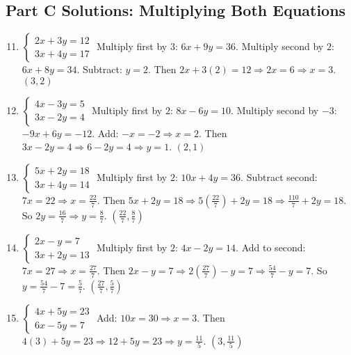\documentclass[12pt]{article}
\begin{document}
\subsection*{Part C Solutions: Multiplying Both Equations}
\begin{enumerate}
  \setcounter{enumi}{10}
  \item \(\begin{cases} 2x + 3y = 12 \\ 3x + 4y = 17 \end{cases}\)  
  Multiply first by \(3\): \(6x + 9y = 36\). Multiply second by \(2\): \(6x + 8y = 34\). Subtract: \(y = 2\).  
  Then \(2x + 3(2) = 12 \Rightarrow 2x = 6 \Rightarrow x = 3\).  
  \(\boxed{(3, 2)}\)

  \item \(\begin{cases} 4x - 3y = 5 \\ 3x - 2y = 4 \end{cases}\)  
  Multiply first by \(2\): \(8x - 6y = 10\). Multiply second by \(-3\): \(-9x + 6y = -12\). Add: \(-x = -2 \Rightarrow x = 2\).  
  Then \(3x - 2y = 4 \Rightarrow 6 - 2y = 4 \Rightarrow y = 1\).  
  \(\boxed{(2, 1)}\)

  \item \(\begin{cases} 5x + 2y = 18 \\ 3x + 4y = 14 \end{cases}\)  
  Multiply first by \(2\): \(10x + 4y = 36\). Subtract second: \(7x = 22 \Rightarrow x = \tfrac{22}{7}\).  
  Then \(5x + 2y = 18 \Rightarrow 5(\tfrac{22}{7}) + 2y = 18 \Rightarrow \tfrac{110}{7} + 2y = 18\).  
  So \(2y = \tfrac{16}{7} \Rightarrow y = \tfrac{8}{7}\).  
  \(\boxed{(\tfrac{22}{7}, \tfrac{8}{7})}\)

  \item \(\begin{cases} 2x - y = 7 \\ 3x + 2y = 13 \end{cases}\)  
  Multiply first by \(2\): \(4x - 2y = 14\). Add to second: \(7x = 27 \Rightarrow x = \tfrac{27}{7}\).  
  Then \(2x - y = 7 \Rightarrow 2(\tfrac{27}{7}) - y = 7 \Rightarrow \tfrac{54}{7} - y = 7\).  
  So \(y = \tfrac{54}{7} - 7 = \tfrac{5}{7}\).  
  \(\boxed{(\tfrac{27}{7}, \tfrac{5}{7})}\)

  \item \(\begin{cases} 4x + 5y = 23 \\ 6x - 5y = 7 \end{cases}\)  
  Add: \(10x = 30 \Rightarrow x = 3\). Then \(4(3) + 5y = 23 \Rightarrow 12 + 5y = 23 \Rightarrow y = \tfrac{11}{5}\).  
  \(\boxed{(3, \tfrac{11}{5})}\)
\end{enumerate}
\end{document}
